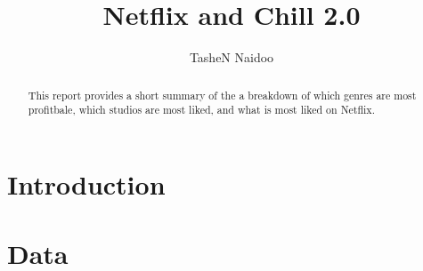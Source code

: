 \documentclass[11pt,preprint, authoryear]{elsarticle}
\numberwithin{equation}{section}
\numberwithin{figure}{section}
\numberwithin{table}{section}
\begin{document}
\begin{frontmatter}  %

\title{Netflix and Chill 2.0}





\author[Add1]{TasheN Naidoo}





\address[Add1]{MCom Economics Student, Stellenosch Univesrsity, South
Africa}


\begin{abstract}
\small{
This report provides a short summary of the a breakdown of which genres
are most profitbale, which studios are most liked, and what is most
liked on Netflix.
}
\end{abstract}

\vspace{1cm}





\vspace{0.5cm}

\end{frontmatter}



\pagestyle{fancy}
\chead{}
\rhead{}
\lfoot{}
\lhead{}
\cfoot{}


\headsep 35pt %




\hypertarget{introduction}{%
\section{\texorpdfstring{Introduction
\label{Introduction}}{Introduction }}\label{introduction}}

\hypertarget{data}{%
\section*{Data}\label{data}}
\end{document}
